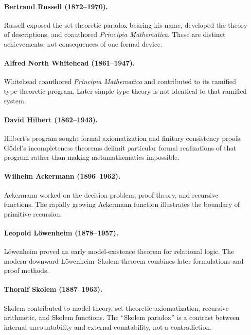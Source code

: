 \paragraph{Bertrand Russell (1872--1970).}
Russell exposed the set-theoretic paradox bearing his name, developed the
theory of descriptions, and coauthored \emph{Principia Mathematica}. These are
distinct achievements, not consequences of one formal device.

\paragraph{Alfred North Whitehead (1861--1947).}
Whitehead coauthored \emph{Principia Mathematica} and contributed to its
ramified type-theoretic program. Later simple type theory is not identical to
that ramified system.

\paragraph{David Hilbert (1862--1943).}
Hilbert's program sought formal axiomatization and finitary consistency proofs.
G\"odel's incompleteness theorems delimit particular formal realizations of
that program rather than making metamathematics impossible.

\paragraph{Wilhelm Ackermann (1896--1962).}
Ackermann worked on the decision problem, proof theory, and recursive
functions. The rapidly growing Ackermann function illustrates the boundary of
primitive recursion.

\paragraph{Leopold L\"owenheim (1878--1957).}
L\"owenheim proved an early model-existence theorem for relational logic. The
modern downward L\"owenheim--Skolem theorem combines later formulations and
proof methods.

\paragraph{Thoralf Skolem (1887--1963).}
Skolem contributed to model theory, set-theoretic axiomatization, recursive
arithmetic, and Skolem functions. The ``Skolem paradox'' is a contrast between
internal uncountability and external countability, not a contradiction.

